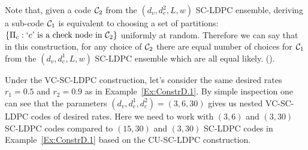 \documentclass[journal,twocolumn]{IEEEtran}
\begin{document}
\begin{Remark}\label{Rmk:EquivNestedConstr2}
Note that, given a code $\mathcal{C}_{2}$ from the $(d_{v},d_{c}^{2},L,w)$ SC-LDPC ensemble, deriving a sub-code $\mathcal{C}_{1}$ is equivalent to choosing a set of partitions: $\{\Pi_{c}: \text{`}c\text{' is a check node in } \mathcal{C}_{2}\}$ uniformly at random. Therefore we can say that in this construction, for any choice of $\mathcal{C}_{2}$ there are equal number of choices for $\mathcal{C}_{1}$ from the $(d_{v},d_{c}^{1},L,w)$ SC-LDPC ensemble which are all equal likely. ({\color{red}{I use this fact later in one of the proofs, but not sure about where to place this remark}}).
\end{Remark}


\begin{Example}\label{Ex:ConstrD.2}
Under the VC-SC-LDPC construction, let's consider the same desired rates $r_{1}=0.5$ and $r_{2}=0.9$ as in Example~\ref{Ex:ConstrD.1}. By simple inspection one can see that the parameters $(d_{v},d_{c}^{1},d_{c}^{2})=(3,6,30)$ gives us nested VC-SC-LDPC codes of desired rates. Here we need to work with $(3,6)$ and $(3,30)$ SC-LDPC codes compared to $(15,30)$ and $(3,30)$ SC-LDPC codes in Example~\ref{Ex:ConstrD.1} based on the CU-SC-LDPC construction.
\end{Example}
\end{document}
